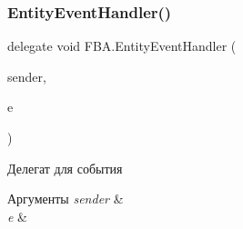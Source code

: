 \subsubsection{\texorpdfstring{Entity\+Event\+Handler()}{EntityEventHandler()}}
{\footnotesize\ttfamily delegate void F\+B\+A.\+Entity\+Event\+Handler (\begin{DoxyParamCaption}\item[{object}]{sender,  }\item[{\mbox{\hyperlink{class_f_b_a_1_1_select_entity_event_args}{Select\+Entity\+Event\+Args}}}]{e }\end{DoxyParamCaption})}



Делегат для события 


\begin{DoxyParams}{Аргументы}
{\em sender} & \\
\hline
{\em e} & \\
\hline
\end{DoxyParams}
